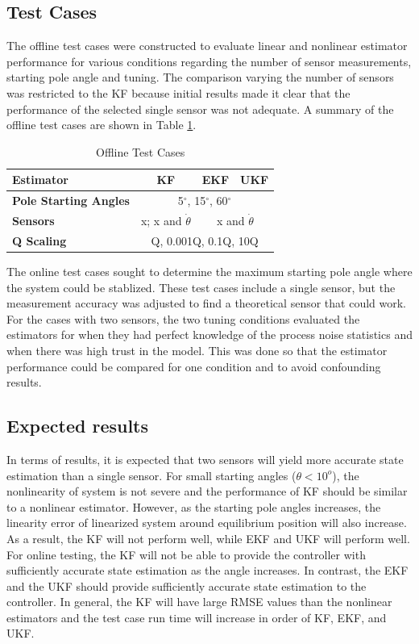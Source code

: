 \documentclass{article}
\begin{document}
\subsection{Test Cases}
The offline test cases were constructed to evaluate linear and nonlinear estimator performance for various conditions regarding the number of sensor measurements, starting pole angle and tuning.  The comparison varying the number of sensors was restricted to the KF because initial results made it clear that the performance of the selected single sensor was not adequate.  A summary of the offline test cases are shown in Table \ref{table:offlinecases}.
\begin{table}[h!]
 \centering
 \renewcommand{\arraystretch}{1.5}
 \begin{tabular}{ |l |c  |c |c |}
 \hline
 	 \textbf{Estimator} & \textbf{KF} & \textbf{EKF} & \textbf{UKF} \\ \hline
 	 \textbf{Pole Starting Angles}  & \multicolumn{3}{|c|}{5$^{\circ}$, 15$^{\circ}$, 60$^{\circ}$} \\ \hline
 	 \textbf{Sensors} & x; x and $\dot\theta$ & \multicolumn{2}{|c|}{x and $\dot\theta$} \\ \hline
 	 \textbf{Q Scaling}  & \multicolumn{3}{|c|}{Q, 0.001Q, 0.1Q, 10Q} \\ \hline
 \end{tabular}
 \caption{Offline Test Cases}
 \label{table:offlinecases}
 \end{table}
The online test cases sought to determine the maximum starting pole angle where the system could be stablized.  These test cases include a single sensor, but the measurement accuracy was adjusted to find a theoretical sensor that could work.  For the cases with two sensors, the two tuning conditions evaluated the estimators for when they had perfect knowledge of the process noise statistics and when there was high trust in the model.  This was done so that the estimator performance could be compared for one condition and to avoid confounding results.

\subsection{Expected results}

In terms of results, it is expected that two sensors will yield more accurate state estimation than a single sensor.  For small starting angles ($\theta<10^o$), the nonlinearity of system is not severe and the performance of KF should be similar to a nonlinear estimator.  However, as the starting pole angles increases, the linearity error of linearized system around equilibrium position will also increase. As a result, the KF will not perform well, while EKF and UKF will perform well. For online testing, the KF will not be able to provide the controller with sufficiently accurate state estimation as the angle increases.  In contrast, the EKF and the UKF should provide sufficiently accurate state estimation to the controller. In general, the KF will have large RMSE values than the nonlinear estimators and the test case run time will increase in order of KF, EKF, and UKF.
\end{document}
